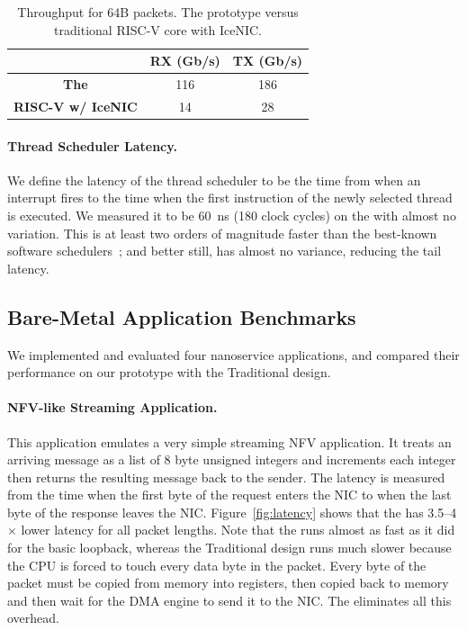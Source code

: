 \begin{table}
\begin{center}
\begin{tabular}{c|c|c}
                          & \textbf{RX (Gb/s)} & \textbf{TX (Gb/s)} \\ \toprule
\textbf{The \name{}}     & 116                & 186                \\
\textbf{RISC-V w/ IceNIC} & 14                 & 28                 \\
\end{tabular}
\caption{Throughput for 64B packets. The \name{} prototype versus traditional RISC-V core with IceNIC.}
\label{tab:throughput}
\end{center}
\end{table}


\paragraph{Thread Scheduler Latency.} We define the latency of the thread scheduler to be the time from when an interrupt fires to the time when the first instruction of the newly selected thread is executed.
We measured it to be \SI{60}{ns} (180 clock cycles) on the \name{} with almost no variation. This is at least two orders of magnitude faster than the best-known software schedulers~\cite{shenango}; and better still, has almost no variance, reducing the tail latency.

\subsection{Bare-Metal Application Benchmarks}
\label{ssec:bare-metal-evals}
We implemented and evaluated four nanoservice applications, and compared their performance on our \name{} prototype with the Traditional design. 

\paragraph{NFV-like Streaming Application.} This application emulates a very simple streaming NFV application. It treats an arriving message as a list of 8 byte unsigned integers and increments each integer then returns the resulting message back to the sender.
The latency is measured from the time when the first byte of the request enters the NIC to when the last byte of the response leaves the NIC.
Figure~\ref{fig:latency} shows that the \name{} has 3.5--4$\times$ lower latency for all packet lengths. Note that the \name{} runs almost as fast as it did for the basic loopback, whereas the Traditional design runs much slower because the CPU is forced to touch every data byte in the packet. Every byte of the packet must be copied from memory into registers, then copied back to memory and then wait for the DMA engine to send it to the NIC. The \name{} eliminates all this overhead.



